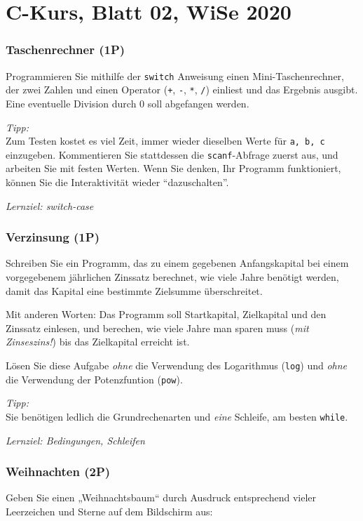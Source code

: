 \documentclass[
	ngerman,
	fontsize=10pt,
	parskip=half,
	titlepage=true,
	DIV=12
]{scrartcl}
\begin{document}
\part*{C-Kurs, Blatt 02, WiSe 2020}

\section{Taschenrechner (1P)}
Programmieren Sie mithilfe der \texttt{switch} Anweisung einen Mini-Taschenrechner,
der zwei Zahlen und einen Operator (\texttt{+}, \texttt{-}, \texttt{*}, \texttt{/})
einliest und das Ergebnis ausgibt.
Eine eventuelle Division durch 0 soll abgefangen werden.

\emph{Tipp:}\\
Zum Testen kostet es viel Zeit, immer wieder dieselben Werte für \texttt{a, b, c} einzugeben. Kommentieren Sie stattdessen die \texttt{scanf}-Abfrage zuerst aus, und arbeiten Sie mit festen Werten. Wenn Sie denken, Ihr Programm funktioniert, können Sie die Interaktivität wieder \enquote{dazuschalten}.

\emph{Lernziel: switch-case}


\section{Verzinsung (1P)}
Schreiben Sie ein Programm, das zu einem gegebenen Anfangskapital
bei einem vorgegebenem jährlichen Zinssatz berechnet,
wie viele Jahre benötigt werden, damit das Kapital eine 
bestimmte Zielsumme überschreitet. 

Mit anderen Worten: Das Programm soll Startkapital, Zielkapital
und den Zinssatz einlesen, und berechen, wie viele Jahre man sparen muss
(\emph{mit Zinseszins!}) bis das Zielkapital erreicht ist.

Lösen Sie diese Aufgabe \emph{ohne} die Verwendung
des Logarithmus (\texttt{log}) und \emph{ohne} die Verwendung
der Potenzfuntion (\texttt{pow}). 

\emph{Tipp:}\\
Sie benötigen ledlich die Grundrechenarten und \emph{eine} Schleife, am besten \texttt{while}.

\emph{Lernziel: Bedingungen, Schleifen}


\section{Weihnachten (2P)}
Geben Sie einen „Weihnachtsbaum“ durch Ausdruck entsprechend vieler
Leerzeichen und Sterne auf dem Bildschirm aus:
\end{document}
